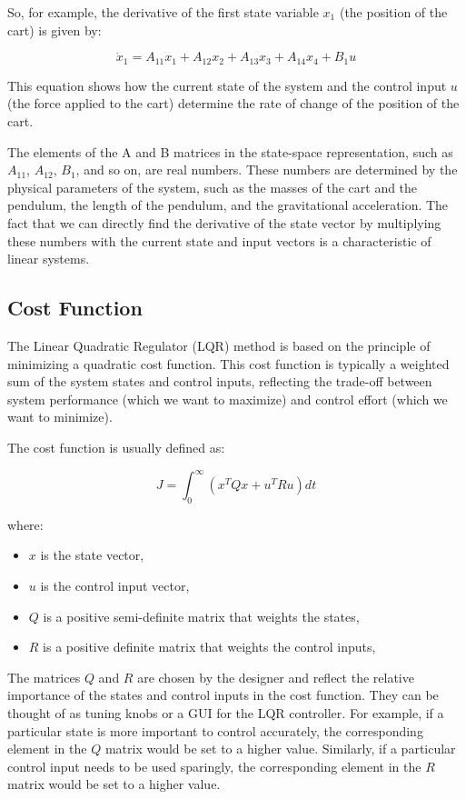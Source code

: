 \documentclass[11pt,twocolumn,twoside,lineno]{pnas-new}
\begin{document}
So, for example, the derivative of the first state variable \(x_1\) (the position of the cart) is given by:

\begin{equation}
\dot{x}_1 = A_{11}x_1 + A_{12}x_2 + A_{13}x_3 + A_{14}x_4 + B_{1}u
\end{equation}

This equation shows how the current state of the system and the control input \(u\) (the force applied to the cart) determine the rate of change of the position of the cart.

The elements of the A and B matrices in the state-space representation, such as \(A_{11}\), \(A_{12}\), \(B_{1}\), and so on, are real numbers. These numbers are determined by the physical parameters of the system, such as the masses of the cart and the pendulum, the length of the pendulum, and the gravitational acceleration. The fact that we can directly find the derivative of the state vector by multiplying these numbers with the current state and input vectors is a characteristic of linear systems.


\subsection{Cost Function}
The Linear Quadratic Regulator (LQR) method is based on the principle of minimizing a quadratic cost function. This cost function is typically a weighted sum of the system states and control inputs, reflecting the trade-off between system performance (which we want to maximize) and control effort (which we want to minimize).

The cost function is usually defined as:

\begin{equation}
J = \int_{0}^{\infty} (x^TQx + u^TRu) dt
\end{equation}

where:
\begin{itemize}
    \item \(x\) is the state vector,
    \item \(u\) is the control input vector,
    \item \(Q\) is a positive semi-definite matrix that weights the states,
    \item \(R\) is a positive definite matrix that weights the control inputs,
\end{itemize}

The matrices \(Q\) and \(R\) are chosen by the designer and reflect the relative importance of the states and control inputs in the cost function. They can be thought of as tuning knobs or a GUI for the LQR controller. For example, if a particular state is more important to control accurately, the corresponding element in the \(Q\) matrix would be set to a higher value. Similarly, if a particular control input needs to be used sparingly, the corresponding element in the \(R\) matrix would be set to a higher value.
\end{document}
